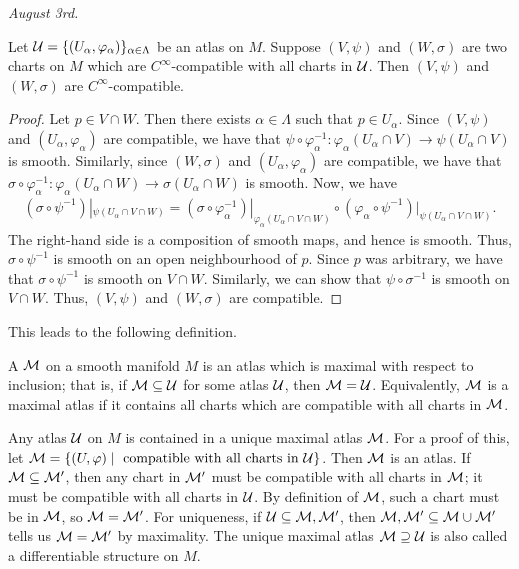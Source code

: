 \textit{August 3rd.}
\begin{proposition}
    Let $\mathcal{U} = \{(U_{\alpha},\varphi_{\alpha})\}_{\alpha \in \Lambda}$ be an atlas on $M$. Suppose $(V,\psi)$ and $(W,\sigma)$ are two charts on $M$ which are $C^{\infty}$-compatible with all charts in $\mathcal{U}$. Then $(V,\psi)$ and $(W,\sigma)$ are $C^{\infty}$-compatible.
\end{proposition}
\begin{proof}
    Let $p \in V \cap W$. Then there exists $\alpha \in \Lambda$ such that $p \in U_{\alpha}$. Since $(V,\psi)$ and $(U_{\alpha},\varphi_{\alpha})$ are compatible, we have that $\psi \circ \varphi_{\alpha}^{-1}:\varphi_{\alpha}(U_{\alpha} \cap V) \to \psi(U_{\alpha} \cap V)$ is smooth. Similarly, since $(W,\sigma)$ and $(U_{\alpha},\varphi_{\alpha})$ are compatible, we have that $\sigma \circ \varphi_{\alpha}^{-1}:\varphi_{\alpha}(U_{\alpha} \cap W) \to \sigma(U_{\alpha} \cap W)$ is smooth. Now, we have
    \begin{align}
        (\sigma \circ \psi^{-1})|_{\psi(U_{\alpha} \cap V \cap W)} = (\sigma \circ \varphi_{\alpha}^{-1})|_{\varphi_{\alpha}(U_{\alpha} \cap V \cap W)} \circ (\varphi_{\alpha} \circ \psi^{-1})|_{\psi(U_{\alpha} \cap V \cap W)}.
    \end{align}
    The right-hand side is a composition of smooth maps, and hence is smooth. Thus, $\sigma \circ \psi^{-1}$ is smooth on an open neighbourhood of $p$. Since $p$ was arbitrary, we have that $\sigma \circ \psi^{-1}$ is smooth on $V\cap W$. Similarly, we can show that $\psi\circ\sigma^{-1}$ is smooth on $V\cap W$. Thus, $(V,\psi)$ and $(W,\sigma)$ are compatible.
\end{proof}

This leads to the following definition.

\begin{definition}
    A  $\mathcal{M}$ on a smooth manifold $M$ is an atlas which is maximal with respect to inclusion; that is, if $\mathcal{M} \subseteq \mathcal{U}$ for some atlas $\mathcal{U}$, then $\mathcal{M} = \mathcal{U}$. Equivalently, $\mathcal{M}$ is a maximal atlas if it contains all charts which are compatible with all charts in $\mathcal{M}$.
\end{definition}
Any atlas $\mathcal{U}$ on $M$ is contained in a unique maximal atlas $\mathcal{M}$. For a proof of this, let $\mathcal{M} = \{(U,\varphi) \mid \text{ compatible with all charts in } \mathcal{U}\}$. Then $\mathcal{M}$ is an atlas. If $\mathcal{M} \subseteq \mathcal{M}'$, then any chart in $\mathcal{M}'$ must be compatible with all charts in $\mathcal{M}$; it must be compatible with all charts in $\mathcal{U}$. By definition of $\mathcal{M}$, such a chart must be in $\mathcal{M}$, so $\mathcal{M} = \mathcal{M}'$. For uniqueness, if $\mathcal{U} \subseteq \mathcal{M}, \mathcal{M}'$, then $\mathcal{M},\mathcal{M}' \subseteq \mathcal{M} \cup \mathcal{M}'$ tells us $\mathcal{M} = \mathcal{M}'$ by maximality. The unique maximal atlas $\mathcal{M} \supseteq \mathcal{U}$ is also called a differentiable structure on $M$.

